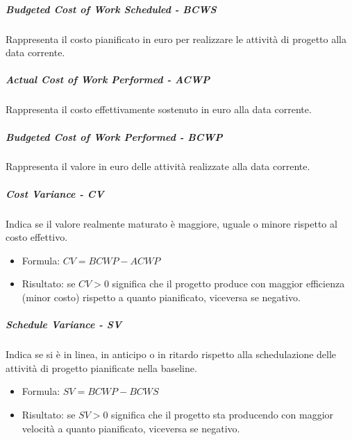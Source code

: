 \subparagraph{Budgeted Cost of Work Scheduled - BCWS}
Rappresenta il costo pianificato in euro per realizzare le attività di progetto alla data corrente.

\subparagraph{Actual Cost of Work Performed - ACWP}
Rappresenta il costo effettivamente sostenuto in euro alla data corrente.

\subparagraph{Budgeted Cost of Work Performed - BCWP}
Rappresenta il valore in euro delle attività realizzate alla data corrente.

\subparagraph{Cost Variance - CV}
Indica se il valore realmente maturato è maggiore, uguale o minore rispetto al costo effettivo.
\begin{itemize}
    \item Formula: $CV = BCWP - ACWP$
    \item Risultato: se $CV > 0$ significa che il progetto produce con maggior efficienza (minor costo) rispetto a quanto pianificato, viceversa se negativo.
\end{itemize}

\subparagraph{Schedule Variance - SV}
Indica se si è in linea, in anticipo o in ritardo rispetto alla schedulazione delle attività di progetto pianificate nella baseline.
\begin{itemize}
    \item Formula: $SV = BCWP - BCWS$
    \item Risultato: se $SV > 0$ significa che il progetto sta producendo con maggior velocità a quanto pianificato, viceversa se negativo.
\end{itemize}